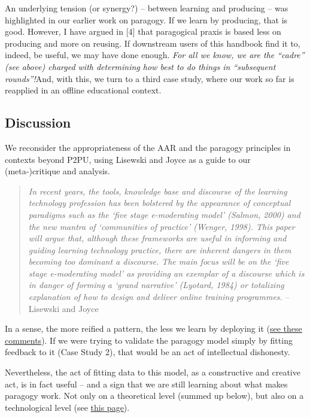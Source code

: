 An underlying tension (or synergy?) -- between learning and producing --
was highlighted in our earlier work on paragogy. If we learn by
producing, that is good. However, I have argued in {[}4{]} that
paragogical praxis is based less on producing and more on reusing. If
downstream users of this handbook find it to, indeed, be useful, we may
have done enough. \emph{For all we know, we are the ``cadre'' (see
above) charged with determining how best to do things in ``subsequent
rounds''!}And, with this, we turn to a third case study, where our work
so far is reapplied in an offline educational context.

\subsection{Discussion}

We reconsider the appropriateness of the AAR and the paragogy principles
in contexts beyond P2PU, using Lisewski and Joyce as a guide to our
(meta-)critique and analysis.

\begin{quote}
\emph{In recent years, the tools, knowledge base and discourse of the
learning technology profession has been bolstered by the appearance of
conceptual paradigms such as the `five stage e-moderating model'
(Salmon, 2000) and the new mantra of `communities of practice' (Wenger,
1998). This paper will argue that, although these frameworks are useful
in informing and guiding learning technology practice, there are
inherent dangers in them becoming too dominant a discourse. The main
focus will be on the `five stage e-moderating model' as providing an
exemplar of a discourse which is in danger of forming a `grand
narrative' (Lyotard, 1984) or totalizing explanation of how to design
and deliver online training programmes.} -- Lisewski and Joyce
\end{quote}

In a sense, the more reified a pattern, the less we learn by deploying
it
(\href{http://socialmediaclassroom.com/host/peeragogy/forum/anti-patterns-concerns-complaints-and-critiques\#comment-2355}{see
these comments}). If we were trying to validate the paragogy model
simply by fitting feedback to it (Case Study 2), that would be an act of
intellectual dishonesty. 

Nevertheless, the act of fitting data to this model, as a constructive
and creative act, is in fact useful -- and a sign that we are still
learning about what makes paragogy work. Not only on a theoretical
level (summed up below), but also on a technological level (see
\href{http://socialmediaclassroom.com/host/peeragogy/wiki/researching-p\%C3\%A6ragogy}{this
  page}).

